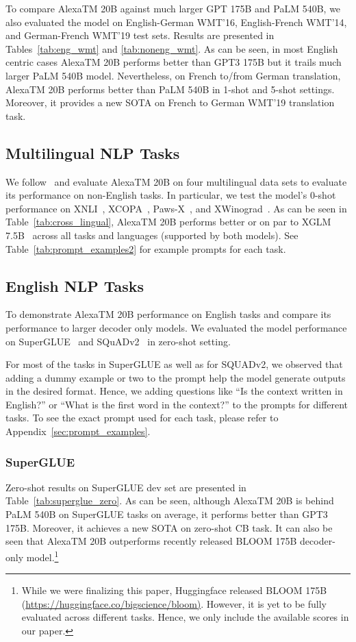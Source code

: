 To compare {AlexaTM 20B} against much larger GPT 175B and PaLM 540B, we also evaluated the model on English-German WMT'16, English-French WMT'14, and German-French WMT'19 test sets. Results are presented in Tables~\ref{tab:eng_wmt} and \ref{tab:noneng_wmt}. As can be seen, in most English centric cases {AlexaTM 20B} performs better than GPT3 175B but it trails much larger PaLM 540B model. Nevertheless, on French to/from German translation, {AlexaTM 20B} performs better than PaLM 540B in 1-shot and 5-shot settings. Moreover, it provides a new SOTA on French to German WMT'19 translation task. 

\subsection{Multilingual NLP Tasks}
\label{sec:cross-lingual}

We follow~\cite{Lin2021FewshotLW} and evaluate {AlexaTM 20B} on four multilingual data sets to evaluate its performance on non-English tasks. In particular, we test the model's 0-shot performance on XNLI~\citep{Conneau2018XNLIEC}, XCOPA~\citep{Ponti2020XCOPAAM}, Paws-X~\citep{Yang2019PAWSXAC}, and XWinograd~\citep{Tikhonov2021ItsAI}. As can be seen in Table~\ref{tab:cross_lingual}, {AlexaTM 20B} performs better or on par to XGLM 7.5B~\citep{Lin2021FewshotLW} across all tasks and languages (supported by both models). See Table~\ref{tab:prompt_examples2} for example prompts for each task. 

\subsection{English NLP Tasks}
\label{sec:english_nlp}

To demonstrate {AlexaTM 20B} performance on English tasks and compare its performance to larger decoder only models. We evaluated the model performance on SuperGLUE~\citep{Wang2019SuperGLUEAS} and SQuADv2~\citep{Rajpurkar2018KnowWY} in zero-shot setting.

For most of the tasks in SuperGLUE as well as for SQUADv2, we observed that adding a dummy example or two to the prompt help the model generate outputs in the desired format. Hence, we adding questions like ``Is the context written in English?'' or ``What is the first word in the context?'' to the prompts for different tasks. To see the exact prompt used for each task, please refer to Appendix~\ref{sec:prompt_examples}.
\subsubsection{SuperGLUE}
Zero-shot results on SuperGLUE dev set are presented in Table~\ref{tab:superglue_zero}. As can be seen, although {AlexaTM 20B} is behind PaLM 540B on SuperGLUE tasks on average, it  performs better than GPT3 175B. Moreover, it achieves a new SOTA on zero-shot CB task. It can also be seen that {AlexaTM 20B} outperforms recently released BLOOM 175B decoder-only model.\footnote{While we were finalizing this paper, Huggingface  released BLOOM 175B (\url{https://huggingface.co/bigscience/bloom)}. However, it is yet to be fully evaluated across different tasks. Hence, we only include the available scores in our paper.}

